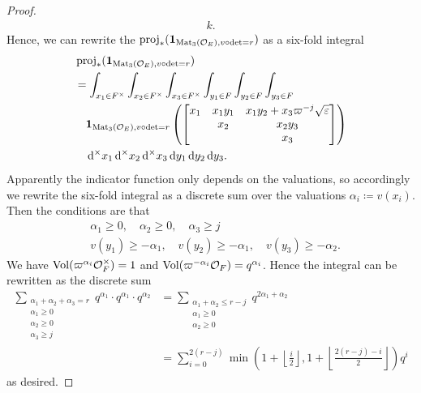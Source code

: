 \begin{proof}
\begin{align*}
    k.
  \end{align*}
  Hence, we can rewrite the $\operatorname{proj}_\ast(\mathbf{1}_{\operatorname{Mat}_3(\mathcal O_E), v\circ\det=r})$
  as a six-fold integral
  \begin{align*}
    &\rproj_\ast(\mathbf{1}_{\Mat_3(\OO_E), v\circ\det=r}) \\
    &= \int_{x_1 \in F^\times} \int_{x_2 \in F^\times} \int_{x_3 \in F^\times}
    \int_{y_1 \in F} \int_{y_2 \in F} \int_{y_3 \in F} \\
    &\quad \mathbf{1}_{\Mat_3(\OO_E), v\circ\det=r} \left(
    \begin{bmatrix}
      x_1 & x_1 y_1 & x_1 y_2 + x_3 \varpi^{-j} \sqrt\eps \\
      & x_2 & x_2 y_3 \\
      & & x_3
    \end{bmatrix}
    \right) \\
    &\quad \odif[{\times,\times,\times}]{x_1,x_2,x_3,y_1,y_2,y_3}.
  \end{align*}
  Apparently the indicator function only depends on the valuations,
  so accordingly we rewrite the six-fold integral as a discrete sum over the valuations
  $\alpha_i \coloneqq v(x_i)$.
  Then the conditions are that
  \begin{align*}
    &\alpha_1 \ge 0, \quad \alpha_2 \ge 0, \quad \alpha_3 \ge j \\
    &v(y_1) \ge - \alpha_1, \quad v(y_2) \ge - \alpha_1, \quad v(y_3) \ge -\alpha_2.
  \end{align*}
  We have $\operatorname{Vol}(\varpi^{\alpha_i} \mathcal O_F^\times) = 1$
  and $\operatorname{Vol}(\varpi^{-\alpha_i} \mathcal O_F) = q^{\alpha_i}$.
  Hence the integral can be rewritten as the discrete sum
  \begin{align*}
    \sum_{\substack{\alpha_1 + \alpha_2 + \alpha_3 = r \\ \alpha_1 \ge 0 \\ \alpha_2 \ge 0 \\ \alpha_3 \ge j}}
    q^{\alpha_1} \cdot q^{\alpha_1} \cdot q^{\alpha_2}
    &= \sum_{\substack{\alpha_1 + \alpha_2 \le r-j \\ \alpha_1 \ge 0 \\ \alpha_2 \ge 0}}
    q^{2\alpha_1+\alpha_2} \\
    &= \sum_{i=0}^{2(r-j)}
    \min \left( 1 + \left\lfloor \frac i2 \right\rfloor,
      1 + \left\lfloor \frac{2(r-j)-i}{2} \right\rfloor
    \right) q^i
  \end{align*}
  as desired.
\end{proof}

